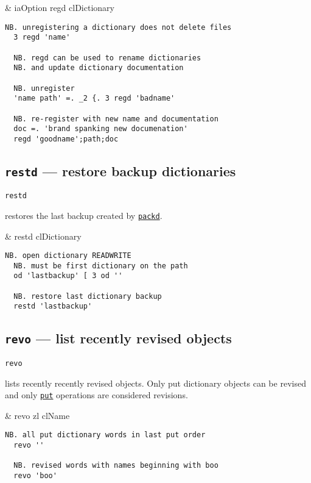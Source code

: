 \begin{wordhead}
\dyad & iaOption regd clDictionary \\
\end{wordhead}
\begin{lstlisting}[frame=single,framerule=0pt] 
  NB. unregistering a dictionary does not delete files 
  3 regd 'name' 

  NB. regd can be used to rename dictionaries 
  NB. and update dictionary documentation
  
  NB. unregister
  'name path' =. _2 {. 3 regd 'badname'  
  
  NB. re-register with new name and documentation 
  doc =. 'brand spanking new documenation' 
  regd 'goodname';path;doc 
\end{lstlisting}                  


\subsection{\texttt{restd} --- restore backup dictionaries}\label{ss:restd} 

\hypertarget{il:restd}{\texttt{restd}}  restores the last backup created by
 \hyperlink{il:packd}{\texttt{packd}}. 

\begin{wordhead}
\monad & restd clDictionary \\
\end{wordhead}
\begin{lstlisting}[frame=single,framerule=0pt] 
  NB. open dictionary READWRITE 
  NB. must be first dictionary on the path
  od 'lastbackup' [ 3 od '' 

  NB. restore last dictionary backup
  restd 'lastbackup' 
\end{lstlisting}                   


\subsection{\texttt{revo} --- list recently revised objects} 

\hypertarget{il:revo}{\texttt{revo}} lists recently recently revised objects. 
Only put dictionary objects can be revised and only 
\hyperlink{il:put}{\texttt{put}} operations are considered revisions. 

\begin{wordhead}
\monad & revo zl \argsep clName \\
\end{wordhead}
\begin{lstlisting}[frame=single,framerule=0pt] 
  NB. all put dictionary words in last put order
  revo ''   
    
  NB. revised words with names beginning with boo  
  revo 'boo'  
\end{lstlisting}  

